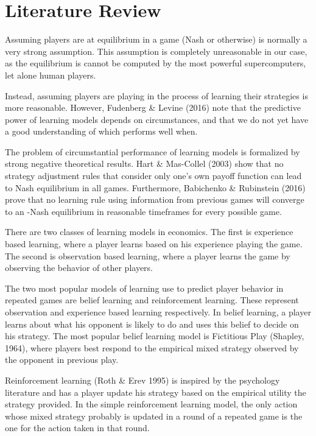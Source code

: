 \documentclass[12pt]{article}
\begin{document}
\section{Literature Review} \label{sec:literature}


Assuming players are at equilibrium in a game (Nash or otherwise) is normally a very strong assumption. This assumption is completely unreasonable in our case, as the equilibrium is cannot be computed by the most powerful supercomputers, let alone human players.

Instead, assuming players are playing in the process of learning their strategies is more reasonable. However, Fudenberg \& Levine (2016) note that the predictive power of learning models depends on circumstances, and that we do not yet have a good understanding of which performs well when.

The problem of circumstantial performance of learning models is formalized by strong negative theoretical results. Hart \& Mas-Collel (2003) show that no strategy adjustment rules that consider only one’s own payoff function can lead to Nash equilibrium in all games. Furthermore, Babichenko \& Rubinstein (2016) prove that no learning rule using information from previous games will converge to an -Nash equilibrium in reasonable timeframes for every possible game.

There are two classes of learning models in economics. The first is experience based learning, where a player learns based on his experience playing the game. The second is observation based learning, where a player learns the game by observing the behavior of other players.

The two most popular models of learning use to predict player behavior in repeated games are belief learning and reinforcement learning. These represent observation and experience based learning respectively. In belief learning, a player learns about what his opponent is likely to do and uses this belief to decide on his strategy. The most popular belief learning model is Fictitious Play (Shapley, 1964), where players best respond to the empirical mixed strategy observed by the opponent in previous play. 

Reinforcement learning (Roth \& Erev 1995) is inspired by the psychology literature and has a player update his strategy based on the empirical utility the strategy provided. In the simple reinforcement learning model, the only action whose mixed strategy probably is updated in a round of a repeated game is the one for the action taken in that round.
\end{document}
